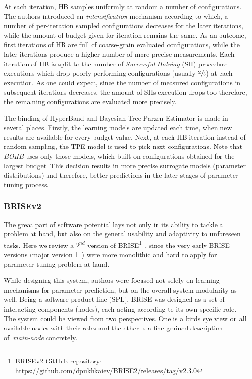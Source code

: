 At each iteration, HB samples uniformly at random a number of configurations. The authors introduced an \emph{intensification} mechanism according to which, a number of per-iteration sampled configurations decreases for the later iterations, while the amount of budget given for iteration remains the same. As an outcome, first iterations of HB are full of coarse-grain evaluated configurations, while the later iterations produce a higher number of more precise measurements. Each iteration of HB is split to the number of \emph{Successful Halving} (SH) procedure executions which drop poorly performing configurations (usually $\sfrac{2}{3}$) at each execution. As one could expect, since the number of measured configurations in subsequent iterations decreases, the amount of SHs execution drops too therefore, the remaining configurations are evaluated more precisely.

The binding of HyperBand and Bayesian Tree Parzen Estimator is made in several places. Firstly, the learning models are updated each time, when new results are available for every budget value. Next, at each HB iteration instead of random sampling, the TPE model is used to pick next configurations. Note that \textit{BOHB} uses only those models, which built on configurations obtained for the largest budget. This decision results in more precise surrogate models (parameter distributions) and therefore, better predictions in the later stages of parameter tuning process.


\subsubsection{BRISEv2}\label{bg: brise}
The great part of software potential lays not only in its ability to tackle a problem at hand, but also on the general usability and adaptivity to unforeseen tasks.
Here we review a $2^{nd}$ version of BRISE\footnote{BRISEv2 GitHub repository: \url{https://github.com/dpukhkaiev/BRISE2/releases/tag/v2.3.0}}~\cite{brise2spl}, since the very early BRISE versions (major version 1~\cite{brise1monolite}) were more monolithic and hard to apply for parameter tuning problem at hand.

While designing this system, authors were focused not solely on learning mechanisms for parameter prediction, but on the overall system modularity as well.
Being a software product line (SPL), BRISE was designed as a set of interacting components (nodes), each acting according to its own specific role. 
The system could be viewed from two perspectives. One is a birds eye view on all available nodes with their roles and the other is a fine-grained description of~\textit{main-node} concretely.

